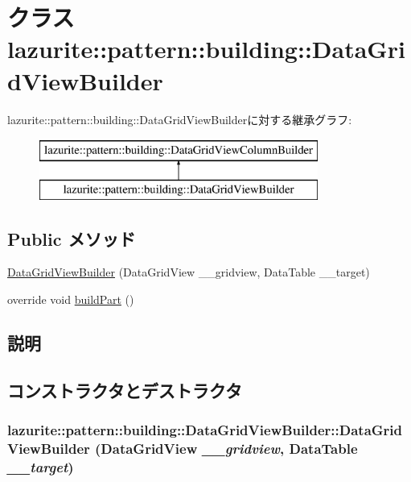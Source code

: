 \hypertarget{classlazurite_1_1pattern_1_1building_1_1_data_grid_view_builder}{
\section{クラス lazurite::pattern::building::DataGridViewBuilder}
\label{classlazurite_1_1pattern_1_1building_1_1_data_grid_view_builder}
}
lazurite::pattern::building::DataGridViewBuilderに対する継承グラフ:\begin{figure}[H]
\begin{center}
\leavevmode
\includegraphics[height=2cm]{classlazurite_1_1pattern_1_1building_1_1_data_grid_view_builder}
\end{center}
\end{figure}
\subsection*{Public メソッド}
\begin{DoxyCompactItemize}
\item 
\hyperlink{classlazurite_1_1pattern_1_1building_1_1_data_grid_view_builder_a57696457b9a03f10f7e5579f1e9e0d9a}{DataGridViewBuilder} (DataGridView \_\-\_\-gridview, DataTable \_\-\_\-target)
\item 
override void \hyperlink{classlazurite_1_1pattern_1_1building_1_1_data_grid_view_builder_a07cdde790aa83c3bede4fa12d05f4bb5}{buildPart} ()
\end{DoxyCompactItemize}


\subsection{説明}


\subsection{コンストラクタとデストラクタ}
\hypertarget{classlazurite_1_1pattern_1_1building_1_1_data_grid_view_builder_a57696457b9a03f10f7e5579f1e9e0d9a}{
\subsubsection[{DataGridViewBuilder}]{\setlength{\rightskip}{0pt plus 5cm}lazurite::pattern::building::DataGridViewBuilder::DataGridViewBuilder (DataGridView {\em \_\-\_\-gridview}, \/  DataTable {\em \_\-\_\-target})}}
\label{classlazurite_1_1pattern_1_1building_1_1_data_grid_view_builder_a57696457b9a03f10f7e5579f1e9e0d9a}

